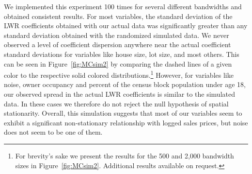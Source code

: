\documentclass{article}\usepackage[]{graphicx}\usepackage[]{color}
\begin{document}
We implemented this experiment 100 times for several different bandwidths and obtained consistent results. For most variables, the standard deviation of the LWR coefficients obtained with our actual data was significantly greater than any standard deviation obtained with the randomized simulated data. We never observed a level of coefficient dispersion anywhere near the actual coefficient standard deviations for variables like house size, lot size, and most others. This can be seen in Figure~\ref{fig:MCsim2} by comparing the dashed lines of a given color to the respective solid colored distributions.\footnote{For brevity's sake we present the results for the 500 and 2,000 bandwidth sizes in Figure~\ref{fig:MCsim2}. Additional results available on request.} However, for variables like noise, owner occupancy and percent of the census block population under age 18, our observed spread in the actual LWR coefficients is similar to the simulated data. In these cases we therefore do not reject the null hypothesis of spatial stationarity. Overall, this simulation suggests that most of our variables seem to exhibit a significant non-stationary relationship with logged sales prices, but noise does not seem to be one of them.
\end{document}
